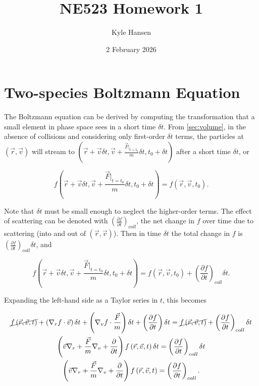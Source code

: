 \documentclass{hw-template}
\title{NE523 Homework 1}
\author{Kyle Hansen}
\date{2 February 2026}
\begin{document}
\maketitle{}

\section{Two-species Boltzmann Equation}

The Boltzmann equation can be derived by computing the transformation that a small element in phase space sees in a short time $\delta t$. From \autoref{sec:volume}, in the absence of collisions and considering only first-order $\delta t$ terms, the particles at $(\vec{r}, \vec{v})$ will stream to {$\left(\vec{r} + \vec{v}\delta t, \vec{v} + \frac{\vec{F}|_{t=t_0}}{m} \delta t, t_0 + \delta t\right)$} after a short time $\delta t$, or 

\begin{equation}
    f\left(\vec{r} + \vec{v}\delta t, \vec{v} + \frac{\vec{F}|_{t=t_0}}{m} \delta t, t_0 + \delta t\right)= f\left(\vec{r}, \vec{v}, t_0 \right).
\end{equation}

Note that $\delta t$ must be small enough to neglect the higher-order terms. The effect of scattering can be denoted with $\left( \frac{\partial f}{\partial t}\right)_{coll}$, the net change in $f$ over time due to scattering (into and out of $(\vec{r}, \vec{v})$). Then in time $\delta t$ the total change in $f$ is $\left( \frac{\partial f}{\partial t}\right)_{coll} \delta t$, and

\begin{equation}
    f\left(\vec{r} + \vec{v}\delta t, \vec{v} + \frac{\vec{F}|_{t=t_0}}{m} \delta t, t_0 + \delta t\right)= f\left(\vec{r}, \vec{v}, t_0 \right) + \left( \frac{\partial f}{\partial t}\right)_{coll}\delta t.
\end{equation}

Expanding the left-hand side as a Taylor series in $t$, this becomes

\begin{gather}
    \cancel{f\left(\vec{r}, \vec{v}, t \right)} + \left(\nabla_r f \cdot \vec{v} \right)\delta t + \left(\nabla_v f \cdot \frac{\vec{F}}{m} \right)\delta t + \left(\frac{\partial f}{\partial t} \right)\delta t= \cancel{f\left(\vec{r}, \vec{v}, t \right)} + \left( \frac{\partial f}{\partial t}\right)_{coll} \delta t\\
    \left(\vec{v} \nabla_r + \frac{\vec{F}}{m} \nabla_v  +\frac{\partial}{\partial t} \right)f\left(\vec{r}, \vec{v}, t \right)\delta t=  \left( \frac{\partial f}{\partial t}\right)_{coll} \delta t\\
    \left(\vec{v} \nabla_r + \frac{\vec{F}}{m} \nabla_v  +\frac{\partial}{\partial t} \right)f\left(\vec{r}, \vec{v}, t \right)=  \left( \frac{\partial f}{\partial t}\right)_{coll}.
\end{gather}
\end{document}
